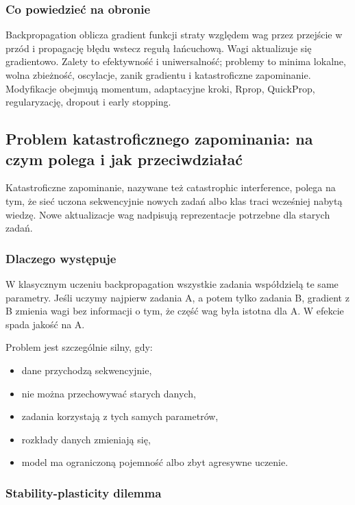 \subsubsection{Co powiedzieć na obronie}

Backpropagation oblicza gradient funkcji straty względem wag przez przejście w przód i propagację błędu wstecz regułą łańcuchową. Wagi aktualizuje się gradientowo. Zalety to efektywność i uniwersalność; problemy to minima lokalne, wolna zbieżność, oscylacje, zanik gradientu i katastroficzne zapominanie. Modyfikacje obejmują momentum, adaptacyjne kroki, Rprop, QuickProp, regularyzację, dropout i early stopping.

\subsection{Problem katastroficznego zapominania: na czym polega i jak przeciwdziałać}

Katastroficzne zapominanie, nazywane też catastrophic interference, polega na tym, że sieć uczona sekwencyjnie nowych zadań albo klas traci wcześniej nabytą wiedzę. Nowe aktualizacje wag nadpisują reprezentacje potrzebne dla starych zadań.

\subsubsection{Dlaczego występuje}

W klasycznym uczeniu backpropagation wszystkie zadania współdzielą te same parametry. Jeśli uczymy najpierw zadania A, a potem tylko zadania B, gradient z B zmienia wagi bez informacji o tym, że część wag była istotna dla A. W efekcie spada jakość na A.

Problem jest szczególnie silny, gdy:
\begin{itemize}
  \item dane przychodzą sekwencyjnie,
  \item nie można przechowywać starych danych,
  \item zadania korzystają z tych samych parametrów,
  \item rozkłady danych zmieniają się,
  \item model ma ograniczoną pojemność albo zbyt agresywne uczenie.
\end{itemize}

\subsubsection{Stability-plasticity dilemma}


